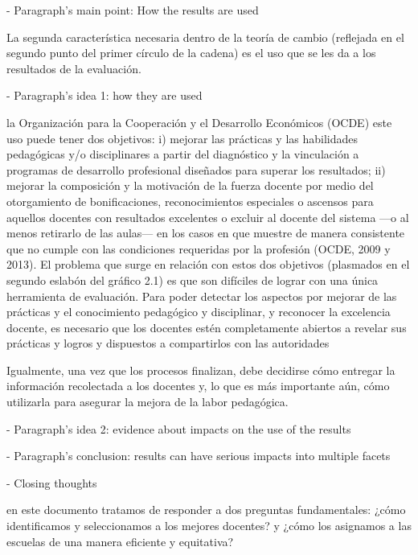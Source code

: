 - Paragraph's main point: How the results are used

La segunda característica necesaria dentro de la teoría de cambio (reflejada en el segundo punto del primer círculo de la cadena) es el uso que se les da a los resultados de la evaluación. \citep{Hincapie_et_al_2020}


- Paragraph's idea 1: how they are used

la Organización para la Cooperación y el Desarrollo Económicos (OCDE) este uso puede tener dos objetivos: i) mejorar las prácticas y las habilidades pedagógicas y/o disciplinares a partir del diagnóstico y la vinculación a programas de desarrollo profesional diseñados para superar los resultados; ii) mejorar la composición y la motivación de la fuerza docente por medio del otorgamiento de bonificaciones, reconocimientos especiales o ascensos para aquellos docentes con resultados excelentes o excluir al docente del sistema —o al menos retirarlo de las aulas— en los casos en que muestre de manera consistente que no cumple con las condiciones requeridas por la profesión (OCDE, 2009 y 2013).
El problema que surge en relación con estos dos objetivos (plasmados en el segundo eslabón del gráfico 2.1) es que son difíciles de lograr con una única herramienta de evaluación.
Para poder detectar los aspectos por mejorar de las prácticas y el conocimiento pedagógico y disciplinar, y reconocer la excelencia docente, es necesario que los docentes estén completamente abiertos a revelar sus prácticas y logros y dispuestos a compartirlos con las autoridades \citep{Hincapie_et_al_2020}

Igualmente, una vez que los procesos finalizan, debe decidirse cómo entregar la información recolectada a los docentes y, lo que es más importante aún, cómo utilizarla para asegurar la mejora de la labor pedagógica. \citep{Hincapie_et_al_2020}



- Paragraph's idea 2: evidence about impacts on the use of the results


- Paragraph's conclusion: results can have serious impacts into multiple facets




- Closing thoughts

en este documento tratamos de responder a dos preguntas fundamentales: ¿cómo identificamos y seleccionamos a los mejores docentes? y ¿cómo los asignamos a las escuelas de una manera eficiente y equitativa? \citep{Bertoni_et_al_2020b}



